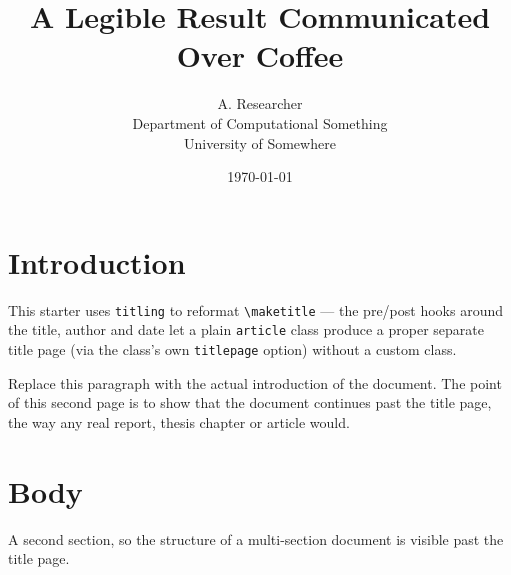 \documentclass[titlepage]{article}
\title{A Legible Result Communicated Over Coffee}
\author{A. Researcher \\ Department of Computational Something \\ University of Somewhere}
\date{\today}
\begin{document}
\maketitle

\section{Introduction}
This starter uses \texttt{titling} to reformat \verb|\maketitle| — the
pre/post hooks around the title, author and date let a plain
\texttt{article} class produce a proper separate title page (via the
class's own \texttt{titlepage} option) without a custom class.

Replace this paragraph with the actual introduction of the document.
The point of this second page is to show that the document continues
past the title page, the way any real report, thesis chapter or article
would.

\section{Body}
A second section, so the structure of a multi-section document is
visible past the title page.
\end{document}
